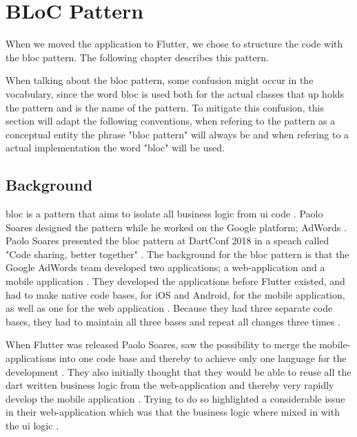 \section{BLoC Pattern}
When we moved the application to Flutter, we chose to structure the code with the \gls{bloc} pattern. The following chapter describes this pattern.

When talking about the \gls{bloc} pattern, some confusion might occur in the vocabulary, since the word \gls{bloc} is used both for the actual classes that up holds the pattern and is the name of the pattern. To mitigate this confusion, this section will adapt the following conventions, when refering to the pattern as a conceptual entity the phrase "\gls{bloc} pattern" will always be and when refering to a actual implementation the word "\gls{bloc}" will be used.

\subsection{Background}
\gls{bloc} is a pattern that aims to isolate all business logic from \gls{ui} code \cite{blocPattern}. Paolo Soares designed the pattern while he worked on the Google platform; AdWords \cite[30 sec]{blocPattern}. Paolo Soares presented the \gls{bloc} pattern at DartConf 2018 in a speach called "Code sharing, better together" \cite{blocPattern}.
The background for the \gls{bloc} pattern is that the Google AdWords team  developed two applications; a web-application and a mobile application \cite[30 sec]{blocPattern}.
They developed the applications before Flutter existed, and had to make native code bases, for iOS and Android, for the mobile application, as well as one for the web application \cite[30 sec]{blocPattern}.
Because they had three separate code bases, they had to maintain all three bases and repeat all changes three times \cite[30 sec]{blocPattern}.

When Flutter was released Paolo Soares, saw the possibility to merge the mobile-applications into one code base and thereby to achieve only one language for the development \cite[1 min 15 sec]{blocPattern}. They also initially thought that they would be able to reuse all the dart written business logic from the web-application and thereby very rapidly develop the mobile application \cite[1 min 48 sec]{blocPattern}. Trying to do so highlighted a considerable issue in their web-application which was that the business logic where mixed in with the \gls{ui} logic \cite[2 min 12 sec]{blocPattern}.


